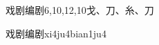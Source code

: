\begin{entry}{戏剧编剧}{6,10,12,10}{⼽、⼑、⽷、⼑}
  \begin{phonetics}{戏剧编剧}{xi4ju4bian1ju4}
  \end{phonetics}
\end{entry}
